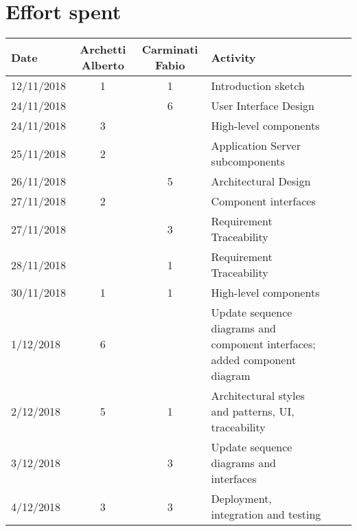 \documentclass[../DD0.tex]{subfiles}
\newcommand{\addHours}[4]{#1 & #2 & #3 & #4 \\\hline}
\begin{document}
\section*{Effort spent}
\label{sec:effort}
  \begin{table}[h!]
  \centering
  \begin{tabularx}{\linewidth}{|l|c|c|X|Xl}
    \hline
    \textbf{Date}  & \textbf{Archetti Alberto} & \textbf{Carminati Fabio} & \textbf{Activity} \\ \hline
    \addHours{12/11/2018}{1}{1}{Introduction sketch}
    \addHours{24/11/2018}{}{6}{User Interface Design}
    \addHours{24/11/2018}{3}{}{High-level components}
    \addHours{25/11/2018}{2}{}{Application Server subcomponents}
    \addHours{26/11/2018}{}{5}{Architectural Design}
    \addHours{27/11/2018}{2}{}{Component interfaces}
    \addHours{27/11/2018}{}{3}{Requirement Traceability}
    \addHours{28/11/2018}{}{1}{Requirement Traceability}
    \addHours{30/11/2018}{1}{1}{High-level components}
    \addHours{1/12/2018}{6}{}{Update sequence diagrams and component interfaces; added component diagram}
    \addHours{2/12/2018}{5}{1}{Architectural styles and patterns, UI, traceability}
    \addHours{3/12/2018}{}{3}{Update sequence diagrams and interfaces}
    \addHours{4/12/2018}{3}{3}{Deployment, integration and testing}
  \end{tabularx}
\end{table}
\end{document}

